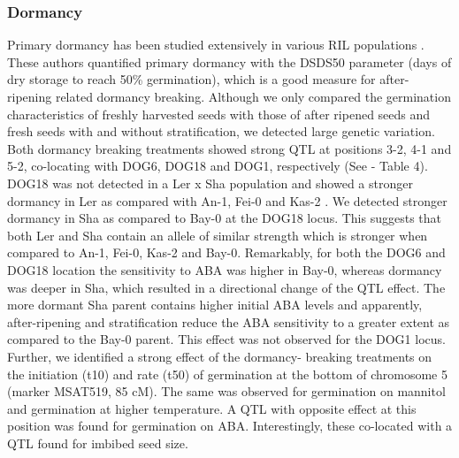 \subsubsection{Dormancy}
Primary dormancy has been studied extensively in various RIL populations \cite{Bentsink:2010}. These 
authors quantified primary dormancy with the DSDS50 parameter (days of dry storage to reach 50\% 
germination), which is a good measure for after-ripening related dormancy breaking. Although we only 
compared the germination characteristics of freshly harvested seeds with those of after ripened 
seeds and fresh seeds with and without stratification, we detected large genetic variation. Both 
dormancy breaking treatments showed strong QTL at positions 3-2, 4-1 and 5-2, co-locating with DOG6, 
DOG18 and DOG1, respectively (See \cite{Joosen:2011} - Table 4). DOG18 was not detected in a Ler x Sha population and showed a 
stronger dormancy in Ler as compared with An-1, Fei-0 and Kas-2 \cite{Bentsink:2010}. We detected stronger 
dormancy in Sha as compared to Bay-0 at the DOG18 locus. This suggests that both Ler and Sha contain 
an allele of similar strength which is stronger when compared to An-1, Fei-0,  Kas-2 and Bay-0. Remarkably, 
for both the DOG6 and DOG18 location the sensitivity to ABA was higher in Bay-0, whereas dormancy was 
deeper in Sha, which resulted in a directional change of the QTL effect. The more dormant Sha parent 
contains higher initial ABA levels and apparently, after-ripening and 
stratification reduce the ABA sensitivity to a greater extent as compared to the Bay-0 parent. This 
effect was not observed for the DOG1 locus. Further, we identified a strong effect of the dormancy-
breaking treatments on the initiation (t10) and rate (t50) of germination at the bottom of chromosome 5 
(marker MSAT519, 85 cM). The same was observed for germination on mannitol and germination at higher 
temperature. A QTL with opposite effect at this position was found for germination on ABA. Interestingly, 
these co-located with a QTL found for imbibed seed size. 

